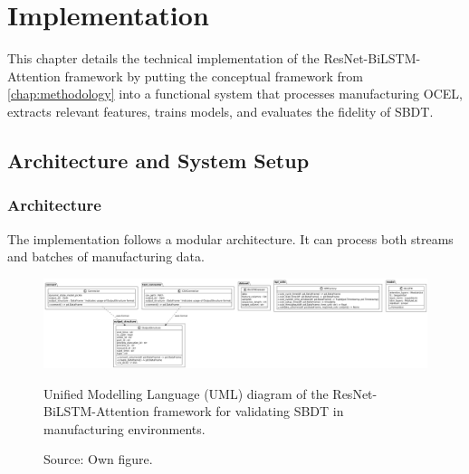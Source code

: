 \chapter{Implementation}
\label{chap:implementation}
This chapter details the technical implementation of the ResNet-BiLSTM-Attention framework \autocite{Fischer2025ResNetBiLSTM} by putting the conceptual framework from \autoref{chap:methodology} into a functional system that processes manufacturing OCEL, extracts relevant features, trains models, and evaluates the fidelity of SBDT.

\section{Architecture and System Setup}

\subsection{Architecture}
The implementation follows a modular architecture. It can process both streams and batches of manufacturing data.

\begin{figure}[htbp]
  \centering
  \includegraphics[width=1\textwidth]{figures/code.png}
  \caption{Unified Modelling Language (UML) diagram of the ResNet-BiLSTM-Attention framework for validating SBDT in manufacturing environments.}
  \caption*{Source: Own figure.}
  \label{fig:uml-diagram}
\end{figure}

